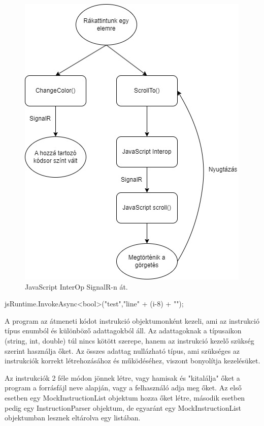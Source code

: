 \begin{figure}[h]
\centering
\includegraphics[scale=0.5]{images/JSpl.jpg}
\caption{JavaScript InterOp SignalR-n át.}
\label{fig:jspl}
\end{figure}

\begin{cpp}
jsRuntime.InvokeAsync<bool>("test","line{" + (i-8) + "}");
\end{cpp}

\newpage
{}
A program az átmeneti kódot instrukció objektumonként kezeli, ami az instrukció típus enumból és különböző adattagokból áll. Az adattagoknak a típusaikon (string, int, double) túl nincs kötött szerepe, hanem az instrukció kezelő szükség szerint használja őket. Az összes adattag nullázható típus, ami szükséges az instrukciók korrekt létrehozásához és működéséhez, viszont bonyolítja kezelésüket.

Az instrukciók 2 féle módon jönnek létre, vagy hamisak és "kitalálja" őket a program a forrásfájl neve alapján, vagy a felhasználó adja meg őket. Az első esetben egy MockInstructionList objektum hozza őket létre, második esetben pedig egy InstructionParser objektum, de egyaránt egy MockInstructionList objektumban lesznek eltárolva egy listában.

